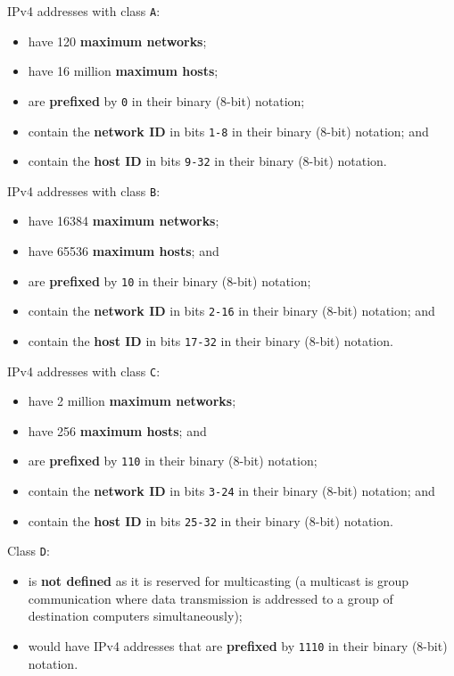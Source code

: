 \documentclass[a4paper]{systems-software}
\begin{document}
IPv4 addresses with class \texttt{A}:
\begin{itemize}
	\item have 120 \textbf{maximum networks};
	\item have 16 million \textbf{maximum hosts};
	\item are \textbf{prefixed} by \texttt{0} in their binary (8-bit) notation;
	\item contain the \textbf{network ID} in bits \texttt{1-8} in their binary (8-bit) notation; and
	\item contain the \textbf{host ID} in bits \texttt{9-32} in their binary (8-bit) notation.
\end{itemize}

IPv4 addresses with class \texttt{B}:
\begin{itemize}
	\item have 16384 \textbf{maximum networks};
	\item have 65536 \textbf{maximum hosts}; and
	\item are \textbf{prefixed} by \texttt{10} in their binary (8-bit) notation;
	\item contain the \textbf{network ID} in bits \texttt{2-16} in their binary (8-bit) notation; and
	\item contain the \textbf{host ID} in bits \texttt{17-32} in their binary (8-bit) notation.
\end{itemize}

IPv4 addresses with class \texttt{C}:
\begin{itemize}
	\item have 2 million \textbf{maximum networks};
	\item have 256 \textbf{maximum hosts}; and
	\item are \textbf{prefixed} by \texttt{110} in their binary (8-bit) notation;
	\item contain the \textbf{network ID} in bits \texttt{3-24} in their binary (8-bit) notation; and
	\item contain the \textbf{host ID} in bits \texttt{25-32} in their binary (8-bit) notation.
\end{itemize}

Class \texttt{D}:
\begin{itemize}
	\item is \textbf{not defined} as it is reserved for multicasting (a multicast is group communication where data transmission is addressed to a group of destination computers simultaneously);
	\item would have IPv4 addresses that are \textbf{prefixed} by \texttt{1110} in their binary (8-bit) notation.
\end{itemize}
\end{document}
